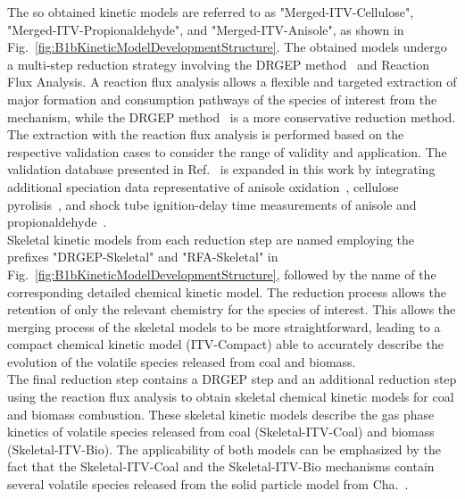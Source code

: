 \begin{refsection}
The so obtained kinetic models are referred to as "Merged-ITV-Cellulose", "Merged-ITV-Propionaldehyde", and "Merged-ITV-Anisole", as shown in Fig.~\ref{fig:B1bKineticModelDevelopmentStructure}. The obtained models undergo a multi-step reduction strategy involving the DRGEP method~\cite{PepiotDesjardins2008a} and Reaction Flux Analysis. A reaction flux analysis allows a flexible and targeted extraction of major formation and consumption pathways of the species of interest from the mechanism, while the DRGEP method~\cite{PepiotDesjardins2008a} is a more conservative reduction method. The extraction with the reaction flux analysis is performed based on the respective validation cases to consider the range of validity and application. The validation database presented in Ref.~\cite{Langer2023} is expanded in this work by integrating additional speciation data representative of anisole oxidation~\cite{Chen2022}, cellulose pyrolisis~\cite{Norinaga2013}, and shock tube ignition-delay time measurements of anisole and propionaldehyde~\cite{Pelucchi2015, AkihKumgeh2011}.
\\
Skeletal kinetic models from each reduction step are named employing the prefixes "DRGEP-Skeletal" and "RFA-Skeletal" in Fig.~\ref{fig:B1bKineticModelDevelopmentStructure}, followed by the name of the corresponding detailed chemical kinetic model. The reduction process allows the retention of only the relevant chemistry for the species of interest. This allows the merging process of the skeletal models to be more straightforward, leading to a compact chemical kinetic model (ITV-Compact) able to accurately describe the evolution of the volatile species released from coal and biomass.
\\
The final reduction step contains a DRGEP step and an additional reduction step using the reaction flux analysis to obtain skeletal chemical kinetic models for coal and biomass combustion. These skeletal kinetic models describe the gas phase kinetics of volatile species released from coal (Skeletal-ITV-Coal) and biomass (Skeletal-ITV-Bio). The applicability of both models can be emphasized by the fact that the Skeletal-ITV-Coal and the Skeletal-ITV-Bio mechanisms contain several volatile species released from the solid particle model from Cha.~.



\end{refsection}
